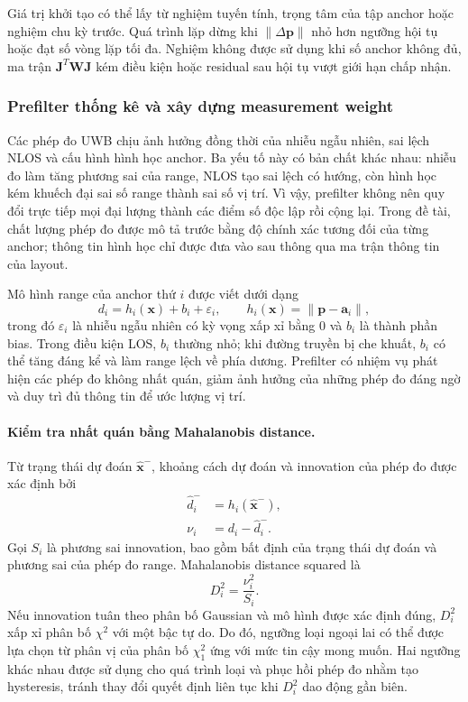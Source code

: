 \documentclass[
  a4paper,
]{report}
\begin{document}
Giá trị khởi tạo có thể lấy từ nghiệm tuyến tính, trọng tâm của tập anchor
hoặc nghiệm chu kỳ trước. Quá trình lặp dừng khi
$\lVert\Delta\mathbf p\rVert$ nhỏ hơn ngưỡng hội tụ hoặc đạt số vòng lặp tối
đa. Nghiệm không được sử dụng khi số anchor không đủ, ma trận
$\mathbf J^T\mathbf W\mathbf J$ kém điều kiện hoặc residual sau hội tụ vượt
giới hạn chấp nhận.

\subsubsection{Prefilter thống kê và xây dựng measurement weight}

Các phép đo UWB chịu ảnh hưởng đồng thời của nhiễu ngẫu nhiên, sai lệch NLOS
và cấu hình hình học anchor. Ba yếu tố này có bản chất khác nhau: nhiễu đo làm
tăng phương sai của range, NLOS tạo sai lệch có hướng, còn hình học kém khuếch
đại sai số range thành sai số vị trí. Vì vậy, prefilter không nên quy đổi trực
tiếp mọi đại lượng thành các điểm số độc lập rồi cộng lại. Trong đề tài, chất
lượng phép đo được mô tả trước bằng độ chính xác tương đối của từng anchor;
thông tin hình học chỉ được đưa vào sau thông qua ma trận thông tin của layout.

Mô hình range của anchor thứ $i$ được viết dưới dạng
\begin{equation}
  d_i=h_i(\mathbf{x})+b_i+\varepsilon_i,
  \qquad
  h_i(\mathbf{x})=\lVert\mathbf{p}-\mathbf{a}_i\rVert,
  \label{eq:prefilter-range-model}
\end{equation}
trong đó $\varepsilon_i$ là nhiễu ngẫu nhiên có kỳ vọng xấp xỉ bằng 0 và
$b_i$ là thành phần bias. Trong điều kiện LOS, $b_i$ thường nhỏ; khi đường
truyền bị che khuất, $b_i$ có thể tăng đáng kể và làm range lệch về phía
dương. Prefilter có nhiệm vụ phát hiện các phép đo không nhất quán, giảm ảnh
hưởng của những phép đo đáng ngờ và duy trì đủ thông tin để ước lượng vị trí.

\paragraph{Kiểm tra nhất quán bằng Mahalanobis distance.}

Từ trạng thái dự đoán $\widehat{\mathbf{x}}^{-}$, khoảng cách dự đoán và
innovation của phép đo được xác định bởi
\begin{align}
  \widehat d_i^{-}&=h_i(\widehat{\mathbf{x}}^{-}),\\
  \nu_i&=d_i-\widehat d_i^{-}.
  \label{eq:prefilter-range-innovation}
\end{align}
Gọi $S_i$ là phương sai innovation, bao gồm bất định của trạng thái dự đoán
và phương sai của phép đo range. Mahalanobis distance squared là
\begin{equation}
  D_i^2=\frac{\nu_i^2}{S_i}.
  \label{eq:prefilter-mahalanobis}
\end{equation}
Nếu innovation tuân theo phân bố Gaussian và mô hình được xác định đúng,
$D_i^2$ xấp xỉ phân bố $\chi^2$ với một bậc tự do. Do đó, ngưỡng loại ngoại
lai có thể được lựa chọn từ phân vị của phân bố $\chi_1^2$ ứng với mức tin cậy
mong muốn. Hai ngưỡng khác nhau được sử dụng cho quá trình loại và phục hồi
phép đo nhằm tạo hysteresis, tránh thay đổi quyết định liên tục khi
$D_i^2$ dao động gần biên.
\end{document}
